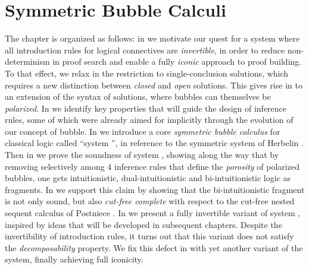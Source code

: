 \setchapterpreamble[u]{\margintoc}
\chapter{Symmetric Bubble Calculi}


The chapter is organized as follows: in  we motivate our
quest for a system where all introduction rules for logical connectives are
\emph{invertible}, in order to reduce non-determinism in proof search and enable
a fully \emph{iconic} approach to proof building. To that effect, we relax in
 the restriction to single-conclusion solutions, which
requires a new distinction between \emph{closed} and \emph{open} solutions. This
gives rise in  to an extension of the syntax of solutions, where
bubbles can themselves be \emph{polarized}. In  we identify
key properties that will guide the design of inference rules, some of which were
already aimed for implicitly through the evolution of our concept of bubble. In
 we introduce a core \emph{symmetric bubble calculus}
for classical logic called ``system '', in reference to the symmetric
system  of Herbelin . Then in
 we prove the soundness of system , showing
along the way that by removing selectively among 4 inference rules that define
the \emph{porosity} of polarized bubbles, one gets intuitionistic,
dual-intuitionistic and bi-intuitionistic logic as fragments. In
 we support this claim by showing that the
bi-intuitionistic fragment is not only sound, but also \emph{cut-free complete}
with respect to the cut-free nested sequent calculus of Postniece
\cite{postniece_deep_2009}. In  we present a fully
invertible variant of system , inspired by ideas that will be developed
in subsequent chapters. Despite the invertibility of introduction rules, it
turns out that this variant does not satisfy the \emph{decomposability}
property. We fix this defect in  with yet another
variant of the system, finally achieving full iconicity.



